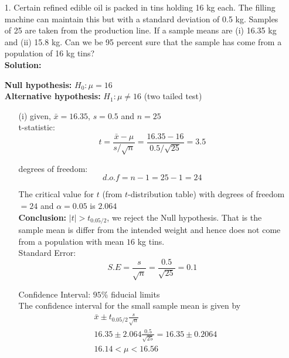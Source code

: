 \documentclass[a4paper,11pt,openright]{report}
\begin{document}
\begin{enumerate}

\item[1.] Certain refined edible oil is packed in tins holding 16 kg each. The filling
machine can maintain this but with a standard deviation of 0.5 kg. Samples of 25 are taken
from the production line. If a sample means are (i) 16.35 kg and \newline (ii) 15.8 kg. Can 
we be 95 percent sure that the sample has come from a population of 16 kg tins? \\

\textbf{Solution:}

\textbf{Null hypothesis:} $H_{0}: \mu = 16$ \\
\textbf{Alternative hypothesis:} $H_{1}: \mu \neq 16$ \hspace{5px} (two tailed test)

\begin{enumerate}
\item[(i)] given, $\bar x = 16.35$, $s = 0.5$ and $n = 25$ \\

t-statistic:
\begin{equation*}
t = \frac{\bar x - \mu}{s/\sqrt{n}}
  = \frac{16.35 - 16}{0.5/\sqrt{25}} 
  = 3.5
\end{equation*}

degrees of freedom:
\begin{equation*}
d.o.f = n - 1 = 25 - 1 = 24
\end{equation*}

The critical value for $t$ (from $t$-distribution table) with degrees of freedom $= 24$ and
$\alpha = 0.05$ is $2.064$ \\

\textbf{Conclusion:} $|t| > t_{0.05/2}$, we reject the Null hypothesis. That is the sample
mean is differ from the intended weight and hence does not come from a population with mean
$16$ kg tins. \\

Standard Error:
\begin{equation*}
S.E = \frac{s}{\sqrt{n}} = \frac{0.5}{\sqrt{25}} = 0.1
\end{equation*}

Confidence Interval: $95\%$ fiducial limits \\
The confidence interval for the small sample mean is given by
\begin{equation*}
\begin{split}
&\bar x \pm t_{0.05/2} \frac{s}{\sqrt{n}} \\
&16.35 \pm 2.064 \frac{0.5}{\sqrt{25}} = 16.35 \pm 0.2064 \\
&16.14 < \mu < 16.56
\end{split}
\end{equation*}


\end{enumerate}
\end{enumerate}
\end{document}
